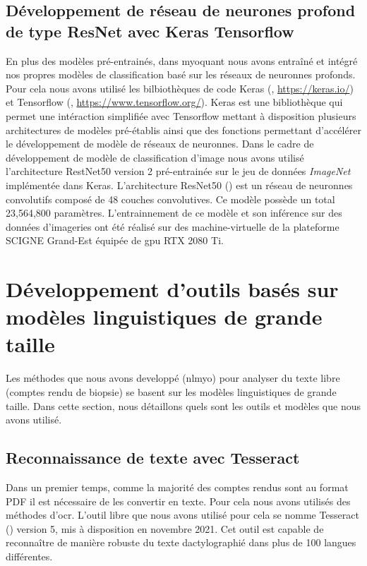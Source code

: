 \subsection{Développement de réseau de neurones profond de type ResNet avec Keras Tensorflow}
En plus des modèles pré-entrainés, dans \gls{myoquant} nous avons entraîné et intégré nos propres modèles de classification basé sur les réseaux de neuronnes profonds. Pour cela nous avons utilisé les bilbiothèques de code Keras (\cite{chollet_keras_2015}, \href{https://keras.io/}{https://keras.io/}) et Tensorflow (\cite{martin_abadi_tensorflow_2015}, \href{https://www.tensorflow.org/}{https://www.tensorflow.org/}). Keras est une bibliothèque qui permet une intéraction simplifiée avec Tensorflow mettant à disposition plusieurs architectures de modèles pré-établis ainsi que des fonctions permettant d'accélérer le développement de modèle de réseaux de neuronnes. Dans le cadre de développement de modèle de classification d'image nous avons utilisé l'architecture RestNet50 version 2 pré-entrainée sur le jeu de données \textit{ImageNet} implémentée dans Keras. L'architecture ResNet50 (\cite{he_deep_2015}) est un réseau de neuronnes convolutifs composé de 48 couches convolutives. Ce modèle possède un total 23,564,800 paramètres. L'entrainnement de ce modèle et son inférence sur des données d'imageries ont été réalisé sur des machine-virtuelle de la plateforme SCIGNE Grand-Est équipée de \gls{gpu} RTX 2080 Ti.

\section{Développement d'outils basés sur modèles linguistiques de grande taille}
Les méthodes que nous avons developpé (\gls{nlmyo}) pour analyser du texte libre (comptes rendu de biopsie) se basent sur les modèles linguistiques de grande taille. Dans cette section, nous détaillons quels sont les outils et modèles que nous avons utilisé.

\subsection{Reconnaissance de texte avec Tesseract}
Dans un premier temps, comme la majorité des comptes rendus sont au format PDF il est nécessaire de les convertir en texte. Pour cela nous avons utilisés des méthodes d'\gls{ocr}. L'outil libre que nous avons utilisé pour cela se nomme Tesseract (\cite{ray_tesseract_2015}) version 5, mis à disposition en novembre 2021. Cet outil est capable de reconnaître de manière robuste du texte dactylographié dans plus de 100 langues différentes.

